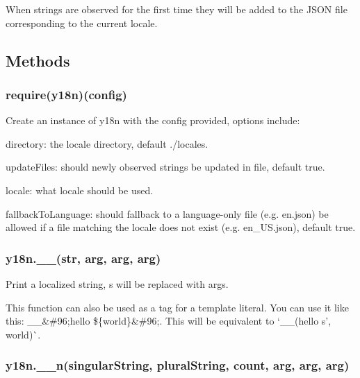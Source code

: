 When strings are observed for the first time they will be added to the J\+S\+ON file corresponding to the current locale.

\subsection*{Methods}

\subsubsection*{require(\textquotesingle{}y18n\textquotesingle{})(config)}

Create an instance of y18n with the config provided, options include\+:


\begin{DoxyItemize}
\item {\ttfamily directory}\+: the locale directory, default {\ttfamily ./locales}.
\item {\ttfamily update\+Files}\+: should newly observed strings be updated in file, default {\ttfamily true}.
\item {\ttfamily locale}\+: what locale should be used.
\item {\ttfamily fallback\+To\+Language}\+: should fallback to a language-\/only file (e.\+g. {\ttfamily en.\+json}) be allowed if a file matching the locale does not exist (e.\+g. {\ttfamily en\+\_\+\+U\+S.\+json}), default {\ttfamily true}.
\end{DoxyItemize}

\subsubsection*{y18n.\+\_\+\+\_\+(str, arg, arg, arg)}

Print a localized string, {\ttfamily s} will be replaced with {\ttfamily arg}s.

This function can also be used as a tag for a template literal. You can use it like this\+: {\ttfamily \+\_\+\+\_\+\&\#96;hello \$\{\textquotesingle{}world\textquotesingle{}\}\&\#96;}. This will be equivalent to `\+\_\+\+\_\+(\textquotesingle{}hello s', \textquotesingle{}world\textquotesingle{})\`{}.

\subsubsection*{y18n.\+\_\+\+\_\+n(singular\+String, plural\+String, count, arg, arg, arg)}

